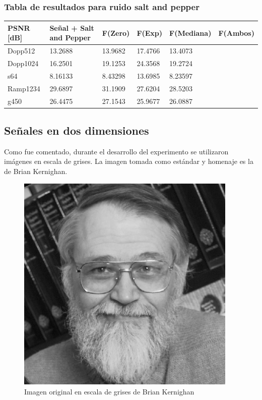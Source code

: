\subsubsection{Tabla de resultados para ruido salt and pepper}

\begin{table}[H]
        \begin{tabular}{|l|lllll|}
                \hline
                \textbf{PSNR [dB]} & Se\~nal + Salt and Pepper  & F(Zero) & F(Exp) & F(Mediana) & F(Ambos) \\ \hline
                    Dopp512 & 13.2688 & 13.9682 & 17.4766 & 13.4073 \\
                    Dopp1024 & 16.2501 & 19.1253 & 24.3568 & 19.2724 \\
                    s64 & 8.16133 & 8.43298 & 13.6985 & 8.23597  \\
                    Ramp1234 & 29.6897 & 31.1909 & 27.6204 & 28.5203 \\
                    g450 & 26.4475 & 27.1543 & 25.9677 & 26.0887  \\ \hline
                    \end{tabular}
                \end{table}


\newpage

        \subsection{Se\~nales en dos dimensiones}

Como fue comentado, durante el desarrollo del experimento se utilizaron
im\'agenes en escala de grises. La imagen tomada como est\'andar y homenaje es 
la de Brian Kernighan.

\begin{figure}[H]
\begin {center}
\includegraphics[width=299pt]{imagenes/brian_kernighan.png}
\end {center}
\caption{Imagen original en escala de grises de Brian Kernighan}
\label{fig:SinProm}
\end{figure}

